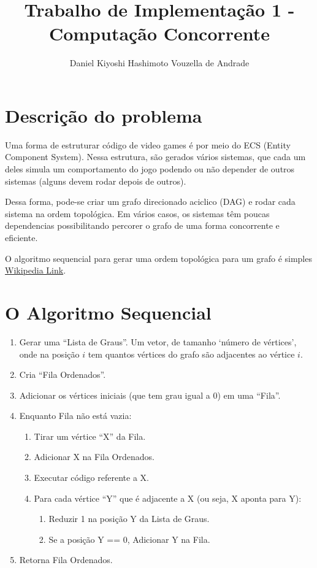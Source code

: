 \documentclass[12pt]{article}
\begin{document}
\title{Trabalho de Implementação 1 - Computação Concorrente}
\author{Daniel Kiyoshi Hashimoto Vouzella de Andrade}
\date{}
\maketitle

\section{Descrição do problema}

Uma forma de estruturar código de video games
é por meio do ECS (Entity Component System).
Nessa estrutura, são gerados vários sistemas,
que cada um deles simula um comportamento do jogo
podendo ou não depender de outros sistemas
(alguns devem rodar depois de outros).

Dessa forma, pode-se criar um grafo direcionado
aciclico (DAG) e rodar cada sistema na ordem topológica.
Em vários casos, os sistemas têm poucas dependencias
possibilitando percorer o grafo de uma forma
concorrente e eficiente.

O algoritmo sequencial para gerar
uma ordem topológica para um grafo é simples
\href{https://en.wikipedia.org/wiki/Topological_sorting}
{Wikipedia Link}.

\newpage
\section{O Algoritmo Sequencial}

\begin{enumerate}
	\item Gerar uma ``Lista de Graus''.
		Um vetor, de tamanho `número de vértices',
		onde na posição $i$ tem quantos vértices do grafo são adjacentes
		ao vértice $i$.
	\item Cria ``Fila Ordenados''.
	\item Adicionar os vértices iniciais (que tem grau igual a 0)
		em uma ``Fila''.
	\item Enquanto Fila não está vazia:
	\begin{enumerate}
		\item Tirar um vértice ``X'' da Fila.
		\item Adicionar X na Fila Ordenados.
		\item Executar código referente a X.
		\item Para cada vértice ``Y'' que é adjacente a X
			(ou seja, X aponta para Y):
		\begin{enumerate}
			\item Reduzir 1 na posição Y da Lista de Graus.
			\item Se a posição Y == 0, Adicionar Y na Fila.
		\end{enumerate}
	\end{enumerate}
	\item Retorna Fila Ordenados.
\end{enumerate}
\end{document}
